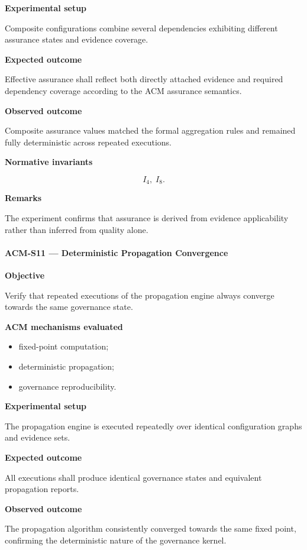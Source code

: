 \documentclass[10pt]{article}
\begin{document}
\textbf{Experimental setup}

Composite configurations combine several dependencies exhibiting different
assurance states and evidence coverage.

\textbf{Expected outcome}

Effective assurance shall reflect both directly attached evidence and required
dependency coverage according to the ACM assurance semantics.

\textbf{Observed outcome}

Composite assurance values matched the formal aggregation rules and remained
fully deterministic across repeated executions.

\textbf{Normative invariants}

\[
I_4,\;
I_8.
\]

\textbf{Remarks}

The experiment confirms that assurance is derived from evidence applicability
rather than inferred from quality alone.

\paragraph{ACM-S11 --- Deterministic Propagation Convergence}

\textbf{Objective}

Verify that repeated executions of the propagation engine always converge
towards the same governance state.

\textbf{ACM mechanisms evaluated}

\begin{itemize}
    \item fixed-point computation;
    \item deterministic propagation;
    \item governance reproducibility.
\end{itemize}

\textbf{Experimental setup}

The propagation engine is executed repeatedly over identical configuration
graphs and evidence sets.

\textbf{Expected outcome}

All executions shall produce identical governance states and equivalent
propagation reports.

\textbf{Observed outcome}

The propagation algorithm consistently converged towards the same fixed point,
confirming the deterministic nature of the governance kernel.
\end{document}

